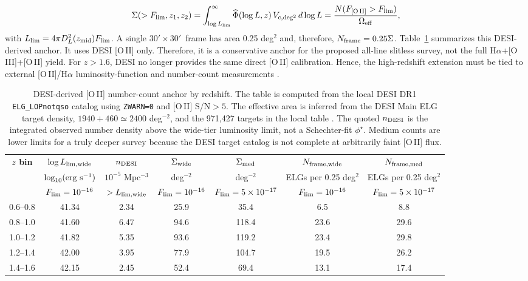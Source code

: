 \documentclass[10pt,onecolumn]{article}
\newcommand{\fovlarge}{$30'\!\times30'$}
\begin{document}
\begin{equation}
  \Sigma(>F_{\rm lim},z_1,z_2)=
  \int_{\log L_{\rm lim}}^\infty
  \widehat{\Phi}(\log L,z)\,V_{\rm c,deg^2}\,d\log L
  =
  \frac{N(F_{\rm [O\,II]}>F_{\rm lim})}{\Omega_{\rm eff}},
\end{equation}
with $L_{\rm lim}=4\pi D_L^2(z_{\rm mid})F_{\rm lim}$. A single \fovlarge\ frame has area 0.25 deg$^2$ and, therefore, $N_{\rm frame}=0.25\Sigma$. Table~\ref{tab:desiLFcounts} summarizes this DESI-derived anchor. It uses DESI [O\,II] only. Therefore, it is a conservative anchor for the proposed all-line slitless survey, not the full H$\alpha$+[O\,III]+[O\,II] yield. For $z>1.6$, DESI no longer provides the same direct [O\,II] calibration. Hence, the high-redshift extension must be tied to external [O\,II]/H$\alpha$ luminosity-function and number-count measurements \cite{comparat2015,saito2020,mehta2015}.

\begin{table}[tp]
\centering
\sffamily\scriptsize
\begin{tabularx}{\textwidth}{@{}c c c c c c c@{}}
\toprule
\textbf{$z$ bin} & \textbf{$\log L_{\rm lim,wide}$} & \textbf{$n_{\rm DESI}$} & \textbf{$\Sigma_{\rm wide}$} & \textbf{$\Sigma_{\rm med}$} & \textbf{$N_{\rm frame,wide}$} & \textbf{$N_{\rm frame,med}$}\\
 & $\log_{10}({\rm erg\ s}^{-1})$ & $10^{-5}$ Mpc$^{-3}$ & deg$^{-2}$ & deg$^{-2}$ & ELGs per 0.25 deg$^2$ & ELGs per 0.25 deg$^2$\\
 & $F_{\rm lim}=10^{-16}$ & $>L_{\rm lim,wide}$ & $F_{\rm lim}=10^{-16}$ & $F_{\rm lim}=5\times10^{-17}$ & $F_{\rm lim}=10^{-16}$ & $F_{\rm lim}=5\times10^{-17}$\\
\midrule
0.6--0.8 & 41.34 & 2.34 & 25.9 & 35.4 & 6.5 & 8.8\\
0.8--1.0 & 41.60 & 6.47 & 94.6 & 118.4 & 23.6 & 29.6\\
1.0--1.2 & 41.82 & 5.35 & 93.6 & 119.2 & 23.4 & 29.8\\
1.2--1.4 & 42.00 & 3.95 & 77.9 & 104.7 & 19.5 & 26.2\\
1.4--1.6 & 42.15 & 2.45 & 52.4 & 69.4 & 13.1 & 17.4\\
\bottomrule
\end{tabularx}
\caption{DESI-derived [O\,II] number-count anchor by redshift. The table is computed from the local DESI DR1 \texttt{ELG\_LOPnotqso} catalog using \texttt{ZWARN=0} and [O\,II] S/N$>5$. The effective area is inferred from the DESI Main ELG target density, $1940+460\simeq2400$ deg$^{-2}$, and the 971,427 targets in the local table \cite{raichoor2022}. The quoted $n_{\rm DESI}$ is the integrated observed number density above the wide-tier luminosity limit, not a Schechter-fit $\phi^\star$. Medium counts are lower limits for a truly deeper survey because the DESI target catalog is not complete at arbitrarily faint [O\,II] flux.}
\label{tab:desiLFcounts}
\end{table}
\end{document}
